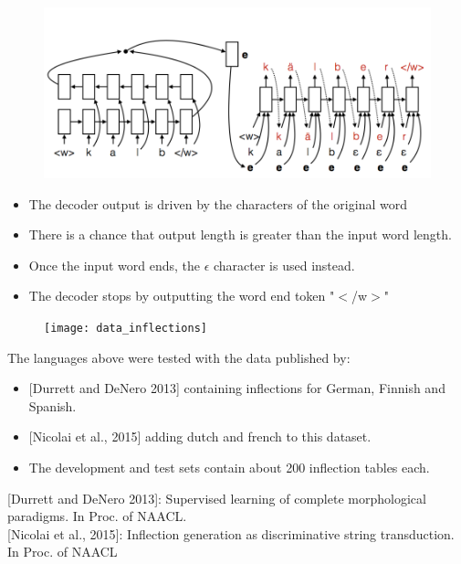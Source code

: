\documentclass[11pt, a4paper, landscape]{article}
\begin{document}
\NewPage{}

\begin{figure}[H]
\begin{center}
  \includegraphics[width=.6\linewidth]{../article/img/inflection-generation}
\end{center}
\end{figure}
\begin{itemize}
\item The decoder output is driven by the characters of the original word
\item There is a chance that output length is greater than the input word length.
\item Once the input word ends, the  $\epsilon$ character is used instead.
\item The decoder stops by outputting the word end token "$<$/w$>$"
\end{itemize}

\NewPage{}

\begin{figure}[H]
\begin{center}
  \texttt{[image: data\_inflections]}
\end{center}
\end{figure}
\vfill
The languages above were tested with the data published by:
\begin{itemize}
\item {[}Durrett and DeNero 2013{]} containing inflections for German, Finnish and Spanish.
\item {[}Nicolai et al., 2015{]} adding dutch and french to this dataset.
\item The development and test sets contain about 200 inflection tables each.
\end{itemize}

\vfill
{\footnotesize {[}Durrett and DeNero 2013{]}: Supervised learning of complete morphological paradigms. In Proc. of NAACL.}\\
{\footnotesize {[}Nicolai et al., 2015{]}: Inflection generation as discriminative string transduction. In Proc. of NAACL}\\
\end{document}
